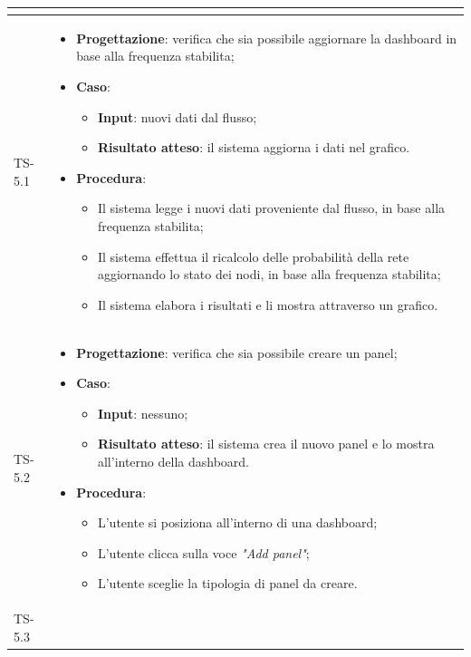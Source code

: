 \begin{longtable}{|C{2.5cm}|C{13cm}|}
\begin{itemize}
\end{itemize}
	\\
	\hline
	{TS-5.1} & 
\begin{itemize}
	\item \textbf{Progettazione}: verifica che sia possibile aggiornare la
	dashboard in base alla frequenza stabilita;
	\item \textbf{Caso}: 
	\begin{itemize}
		\item \textbf{Input}: nuovi dati dal flusso;
		\item \textbf{Risultato atteso}: il sistema aggiorna i dati nel grafico.
	\end{itemize}
	\item \textbf{Procedura}:
	\begin{itemize}
		\item Il sistema legge i nuovi dati proveniente dal flusso, in base alla frequenza stabilita;
		\item Il sistema effettua il ricalcolo delle probabilità della rete aggiornando lo stato dei nodi, in base alla frequenza stabilita;
		\item Il sistema elabora i risultati e li mostra attraverso un grafico.
	\end{itemize} 
\end{itemize}
\\
	\hline
	{TS-5.2} & 
\begin{itemize}
	\item \textbf{Progettazione}: verifica che sia possibile creare un panel;
	\item \textbf{Caso}: 
	\begin{itemize}
		\item \textbf{Input}: nessuno;
		\item \textbf{Risultato atteso}: il sistema crea il nuovo panel e lo mostra all'interno della dashboard.
	\end{itemize}
	\item \textbf{Procedura}:
	\begin{itemize}
		\item L'utente si posiziona all'interno di una dashboard;
		\item L'utente clicca sulla voce \emph{"Add panel"};
		\item L'utente sceglie la tipologia di panel da creare.
	\end{itemize} 
\end{itemize}
 \\
	\hline
	{TS-5.3} & 
\begin{itemize}

\end{itemize}
\end{longtable}
